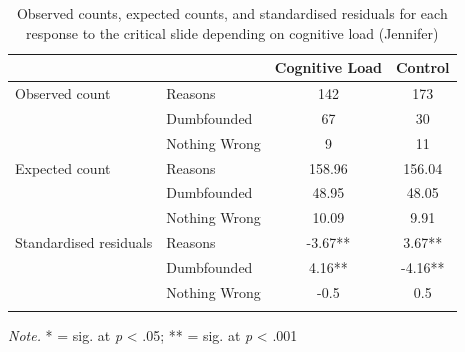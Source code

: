 \documentclass[
  man,floatsintext]{apa6}
\begin{document}
\begin{table}[tbp]

\begin{center}
\begin{threeparttable}

\caption{\label{tab:tabS6tab1dumbJennifer}Observed counts, expected counts, and standardised residuals for each response to the critical slide depending on cognitive load (Jennifer)}

\begin{tabular}{llcc}
\toprule
 & \multicolumn{1}{c}{} & \multicolumn{1}{c}{Cognitive Load} & \multicolumn{1}{c}{Control}\\
\midrule
Observed count & Reasons & 142 & 173\\
 & Dumbfounded & 67 & 30\\
 & Nothing Wrong & 9 & 11\\
Expected count & Reasons & 158.96 & 156.04\\
 & Dumbfounded & 48.95 & 48.05\\
 & Nothing Wrong & 10.09 & 9.91\\
Standardised residuals & Reasons & -3.67** & 3.67**\\
 & Dumbfounded & 4.16** & -4.16**\\
 & Nothing Wrong & -0.5 & 0.5\\
\bottomrule
\addlinespace
\end{tabular}

\begin{tablenotes}[para]
\normalsize{\textit{Note.} * = sig. at \emph{p} < .05; ** = sig. at \emph{p} < .001}
\end{tablenotes}

\end{threeparttable}
\end{center}

\end{table}
\end{document}
